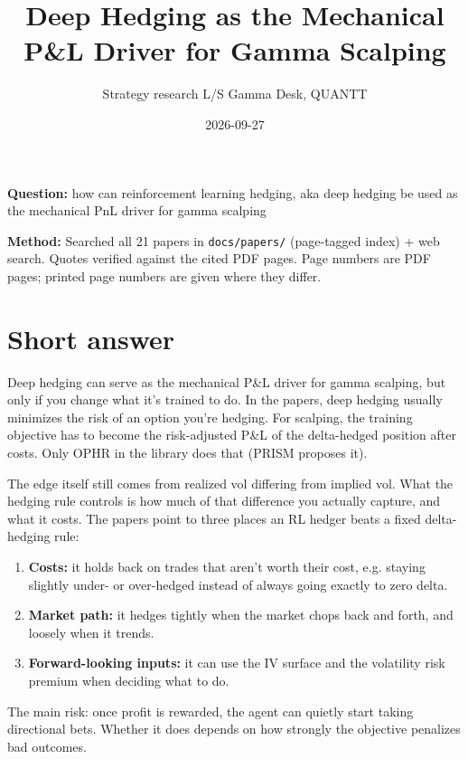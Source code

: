 \documentclass{article}
\title{Deep Hedging as the Mechanical P\&L Driver for Gamma Scalping}
\author{Strategy research \textperiodcentered{} L/S Gamma Desk, QUANTT}
\date{2026-09-27}
\begin{document}
\maketitle

\textbf{Question:} how can reinforcement learning hedging, aka deep hedging be used as the  mechanical PnL driver  for gamma scalping

\textbf{Method:} Searched all 21 papers in \texttt{docs/\allowbreak{}papers/\allowbreak{}} (page-tagged index) + web search. Quotes verified against the cited PDF pages. Page numbers are PDF pages; printed page numbers are given where they differ.

\section{Short answer}

Deep hedging can serve as the mechanical P\&L driver for gamma scalping, but only if you change what it's trained to do. In the papers, deep hedging usually minimizes the risk of an option you're hedging. For scalping, the training objective has to become the risk-adjusted P\&L of the delta-hedged position after costs. Only OPHR in the library does that (PRISM proposes it).

The edge itself still comes from realized vol differing from implied vol. What the hedging rule controls is how much of that difference you actually capture, and what it costs. The papers point to three places an RL hedger beats a fixed delta-hedging rule:

\begin{enumerate}

\item \textbf{Costs:} it holds back on trades that aren't worth their cost, e.g. staying slightly under- or over-hedged instead of always going exactly to zero delta.

\item \textbf{Market path:} it hedges tightly when the market chops back and forth, and loosely when it trends.

\item \textbf{Forward-looking inputs:} it can use the IV surface and the volatility risk premium when deciding what to do.

\end{enumerate}

The main risk: once profit is rewarded, the agent can quietly start taking directional bets. Whether it does depends on how strongly the objective penalizes bad outcomes.
\end{document}
